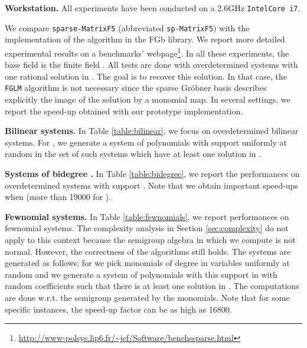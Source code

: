 \documentclass[12pt]{article}
\numberwithin{equation}{section}
\numberwithin{theorem}{section}
\begin{document}
{\bf Workstation.} All experiments have been conducted on a  2.6GHz {\tt IntelCore i7}.


We compare 
{\tt sparse-MatrixF5} (abbreviated {\tt sp-MatrixF5}) with the
implementation of the  algorithm in the FGb library. We report
more detailed experimental results on a benchmarks'
webpage\footnote{\url{http://www-polsys.lip6.fr/~jcf/Software/benchssparse.html}}. In all these experiments, the base
field  is the finite field . All tests are done with
overdetermined systems with one rational solution in
. The goal is to recover this solution. In that case,
the {\tt FGLM} algorithm is not necessary since the sparse Gr\"obner
basis describes explicitly the image of the solution by a monomial
map. In several settings, we report the speed-up obtained with our
prototype implementation.


{\bf Bilinear systems.} In Table \ref{table:bilinear}, we focus on overdetermined bilinear
systems. For , we generate a system of  polynomials
with support  uniformly at random in
the set of such systems which have at least one solution in
.

{\bf Systems of bidegree .} In Table \ref{table:bidegree}, we
report the performances on overdetermined systems with support . Note that we obtain important speed-ups when
 (more than 19000 for ).

{\bf Fewnomial systems.} In Table \ref{table:fewnomials}, we report
performances on fewnomial systems. The complexity analysis in
Section \ref{sec:complexity} do not apply to this context because the
semigroup algebra in which we compute is not normal. However, the correctness of the algorithms still holds. The
systems are generated as follows: for  we pick 
monomials of degree  in  variables uniformly at random and we
generate a system of  polynomials with this support in
 with random coefficients such that there
is at least one solution in . The computations are done
w.r.t. the semigroup generated by the  monomials. Note that for
some specific instances, the speed-up factor can be as high as 16800.
\end{document}
